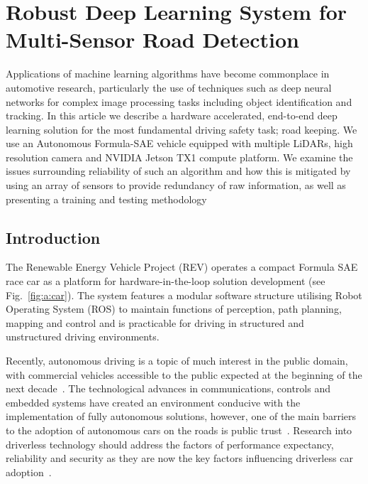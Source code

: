\chapter{Robust Deep Learning System for Multi-Sensor Road Detection}
\label{ch:app1}

\ifpdf
\graphicspath{{Appendix1/Figs/Raster/}{Appendix1/Figs/PDF/}{Appendix1/Figs/}}
\else
\graphicspath{{Appendix1/Figs/Vector/}{Appendix1/Figs/}}
\fi

Applications of machine learning algorithms have become commonplace in automotive research, particularly the use of techniques such as deep neural networks for complex image processing tasks including object identification and tracking. In this article we describe a hardware accelerated, end-to-end deep learning solution for the most fundamental driving safety task; road keeping. We use an Autonomous Formula-SAE vehicle equipped with multiple LiDARs, high resolution camera and NVIDIA Jetson TX1 compute platform. We examine the issues surrounding reliability of such an algorithm and how this is mitigated by using an array of sensors to provide redundancy of raw information, as well as presenting a training and testing methodology

\section{Introduction}
The Renewable Energy Vehicle Project (REV) operates a compact Formula SAE race car as a platform for hardware-in-the-loop solution development (see Fig.~\ref{fig:a:car}). The system features a modular software structure utilising Robot Operating System (ROS) to maintain functions of perception, path planning, mapping and control and is practicable for driving in structured and unstructured driving environments.

Recently, autonomous driving is a topic of much interest in the public domain, with commercial vehicles accessible to the public expected at the beginning of the next decade~\cite{bimbraw_autonomous_2015}. The technological advances in communications, controls and embedded systems have created an environment conducive with the implementation of fully autonomous solutions, however, one of the main barriers to the adoption of autonomous cars on the roads is public trust~\cite{kaur_trust_2018}. Research into driverless technology should address the factors of performance expectancy, reliability and security as they are now the key factors influencing driverless car adoption~\cite{kaur_trust_2018}. 


